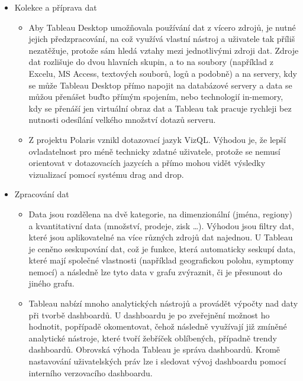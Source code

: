 \documentclass[czech,BP]{thesiskiv}
\begin{document}
 \begin{itemize}
 	\item Kolekce a příprava dat
 	\begin{itemize}
		\item Aby Tableau Desktop umožňovala používání dat z vícero zdrojů, je nutné jejich předzpracování, na což využívá vlastní nástroj a uživatele tak příliš nezatěžuje, protože sám hledá vztahy mezi jednotlivými zdroji dat. Zdroje dat rozlišuje do dvou hlavních skupin, a to na soubory (například z Excelu, MS Access, textových souborů, logů a podobně) a na servery, kdy se může Tableau Desktop přímo napojit na databázové servery a data se můžou přenášet buďto přímým spojením, nebo technologií in-memory, kdy se přenáší jen virtuální obraz dat a Tableau tak pracuje rychleji bez nutnosti odesílání velkého množství dotazů serveru.
		
		\item Z projektu Polaris vznikl dotazovací jazyk VizQL\texttrademark. \cite{VizQL} Výhodou je, že lepší ovladatelnost pro méně technicky zdatné uživatele, protože se nemusí orientovat v dotazovacích jazycích a přímo mohou vidět výsledky vizualizací pomocí systému drag and drop.
 	\end{itemize}
 	\item Zpracování dat
 	\begin{itemize}
		\item Data jsou rozdělena na dvě kategorie, na dimenzionální (jména, regiony) a kvantitativní data (množství, prodeje, zisk …). Výhodou jsou filtry dat, které jsou aplikovatelné na více různých zdrojů dat najednou. U Tableau je ceněno seskupování dat, což je funkce, která automaticky seskupí data, které mají společné vlastnosti (například geografickou polohu, symptomy nemocí) a následně lze tyto data v grafu zvýraznit, či je přesunout do jiného grafu. 
		
		\item Tableau nabízí mnoho analytických nástrojů a provádět výpočty nad daty při tvorbě dashboardů. U dashboardu je po zveřejnění možnost ho hodnotit, popřípadě okomentovat, čehož následně využívají již zmíněné analytické nástroje, které tvoří žebříček oblíbených, případně trendy dashboardů. Obrovská výhoda Tableau je správa dashboardů. Kromě nastavování uživatelských práv lze i sledovat vývoj dashboardu pomocí interního verzovacího dashboardu. 
		
 	\end{itemize}
 \end{itemize}
 
\end{document}
